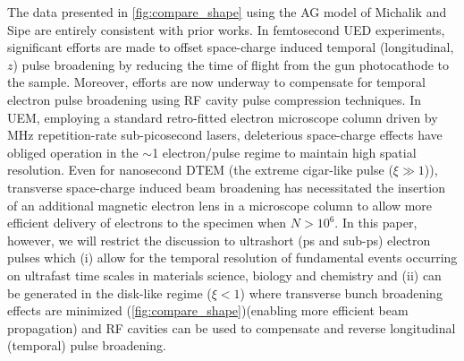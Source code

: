 The data presented in \ref{fig:compare_shape} using the AG model of Michalik and Sipe \cite{michalik_analytic_2006} are entirely consistent with prior works.\cite{reed_femtosecond_2006,siwick_ultrafast_2002}
In femtosecond UED experiments, significant efforts are made to offset space-charge induced temporal (longitudinal, $z$) pulse broadening by reducing the time of flight from the gun photocathode to the sample.\cite{siwick_ultrafast_2002,reed_evolution_2009}
Moreover, efforts are now underway to compensate for temporal electron pulse broadening using RF cavity pulse compression techniques.\cite{oudheusden_electron_2007}
In UEM, employing a standard retro-fitted electron microscope column driven by MHz repetition-rate sub-picosecond lasers,\cite{lobastov_four-dimensional_2005} deleterious space-charge effects have obliged operation in the $\sim$1 electron/pulse regime to maintain high spatial resolution.
Even for nanosecond DTEM (the extreme cigar-like pulse ($\xi \gg 1 $)), transverse space-charge induced beam broadening has necessitated the insertion of an additional magnetic electron lens in a microscope column to allow more efficient delivery of electrons to the specimen when $ N > 10^{6} $.\cite{lagrange_nanosecond_2008}
In this paper, however, we will restrict the discussion to ultrashort (ps and sub-ps) electron pulses which (i) allow for the temporal resolution of fundamental events occurring on ultrafast time scales in materials science, biology and chemistry \cite{king_ultrafast_2005} and (ii) can be generated in the disk-like regime ($ \xi < 1 $) where transverse bunch broadening effects are minimized (\ref{fig:compare_shape})(enabling more efficient beam propagation) and RF cavities can be used to compensate and reverse longitudinal (temporal) pulse broadening.\cite{veisz_hybrid_2007}

